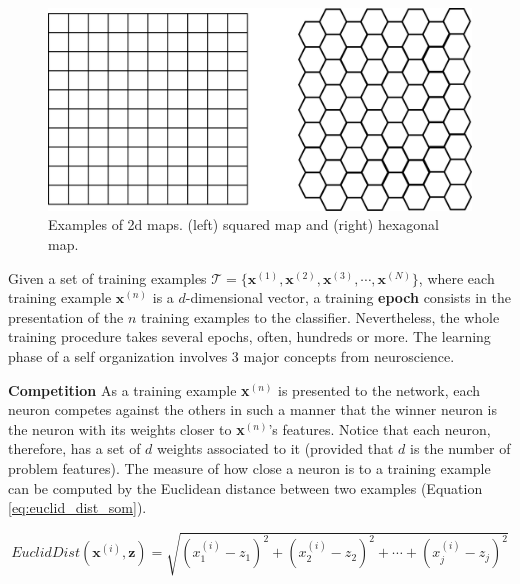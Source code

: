 \begin{figure}[h]
\centering
\includegraphics[scale=0.08]{ "Part 3 - Learning Systems/Unsupervised Learning/Self-Organizing Maps/figs/maps"}
\caption{Examples of 2d maps. (left) squared map and (right) hexagonal map.}
\label{fig:topologic}
\end{figure}

Given a set of training examples $\mathcal{T} = \{\mathbf{x}^{(1)},\mathbf{x}^{(2)},\mathbf{x}^{(3)},\cdots,\mathbf{x}^{(N)}\}$, where each training example $\mathbf{x}^{(n)}$ is a $d$-dimensional vector, a training \textbf{epoch} consists in the presentation of the $n$ training examples to the classifier. Nevertheless, the whole training procedure takes several epochs, often, hundreds or more. The learning phase of a self organization involves 3 major concepts from neuroscience.
\vspace{0.2cm}

\noindent\textbf{Competition} As a training example \textbf{x}$^{(n)}$ is presented to the network, each neuron competes against the others in such a manner that the winner neuron is the neuron with its weights closer to \textbf{x}$^{(n)}$'s features. Notice that each neuron, therefore, has a set of $d$ weights associated to it (provided that $d$ is the number of problem features). The measure of how close a neuron is to a training example can be computed by the Euclidean distance between two examples (Equation \ref{eq:euclid_dist_som}).

\begin{equation}
    EuclidDist(\textbf{x}^{(i)},\textbf{z}) = \sqrt{(x^{(i)}_{1} - z_1)^{2} + (x^{(i)}_{2} - z_2)^{2} + \cdots + (x^{(i)}_j - z_j)^{2}}
    \label{eq:euclid_dist_som}
\end{equation}

\vspace{0.2cm}

